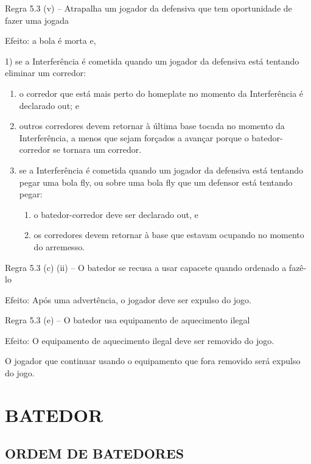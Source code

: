 	Regra 5.3 (v) -- Atrapalha um jogador da defensiva que tem oportunidade de fazer uma jogada

	 Efeito: a bola é morta e,

 1) se a Interferência é cometida quando um jogador da defensiva está tentando eliminar um corredor:
\begin{enumerate}[label=(\alph*)]
	\item   o corredor que está mais perto do \gls{homeplate} no momento da Interferência é declarado \gls{out}; e
	\item  outros corredores devem retornar à última base tocada no momento da Interferência, a menos que sejam forçados a avançar porque o batedor-corredor se tornara um corredor.
	\item se a Interferência é cometida quando um jogador da defensiva está tentando pegar uma bola \gls{fly}, ou sobre uma bola \gls{fly} que um defensor está tentando pegar:
	\begin{enumerate}[label=(\alph*)]
		\item  o batedor-corredor deve ser declarado \gls{out}, e
		\item  os corredores devem retornar à base que estavam ocupando no momento do arremesso.

	\end{enumerate}
\end{enumerate}

	 Regra 5.3 (c) (ii) -- O batedor se recusa a usar capacete quando ordenado a fazê-lo

	Efeito: Após uma advertência, o jogador deve ser expulso do jogo.

 	Regra 5.3 (e) -- O batedor usa equipamento de aquecimento ilegal

	Efeito: O equipamento de aquecimento ilegal deve ser removido do jogo.

	O jogador que continuar usando o equipamento que fora removido será  expulso do jogo.


\section{BATEDOR}
\subsection{ORDEM DE BATEDORES}

